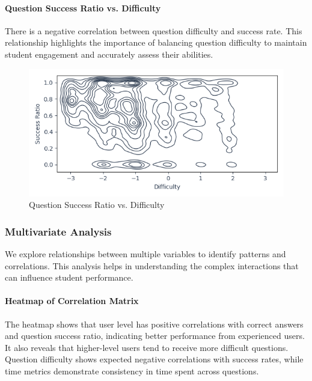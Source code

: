 \documentclass[
    a4paper, %
    10pt, %
    twoside, %
]{LTJournalArticle}
\begin{document}
\paragraph{Question Success Ratio vs. Difficulty}
There is a negative correlation between question difficulty and success rate. This relationship highlights the importance of balancing question difficulty to maintain student engagement and accurately assess their abilities.

\begin{figure}[H]
    \centering
    \includegraphics[width=\columnwidth]{images/success_ratio_vs_difficulty_kde.png}
    \caption{Question Success Ratio vs. Difficulty}
    \label{fig:success-ratio-vs-difficulty}
\end{figure}

\subsubsection{Multivariate Analysis}
We explore relationships between multiple variables to identify patterns and correlations. This analysis helps in understanding the complex interactions that can influence student performance.

\paragraph{Heatmap of Correlation Matrix}
The heatmap shows that user level has positive correlations with correct answers and question success ratio, indicating better performance from experienced users. It also reveals that higher-level users tend to receive more difficult questions. Question difficulty shows expected negative correlations with success rates, while time metrics demonstrate consistency in time spent across questions.
\end{document}
